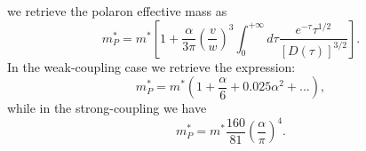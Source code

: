 we retrieve the polaron effective mass as 
\begin{equation}
    m^*_P=m^*\left[1+\frac{\alpha}{3\pi}\left(\frac{v}{w}\right)^3\int_0^{+\infty}d\tau \frac{e^{-\tau}\tau^{1/2}}{[D(\tau)]^{3/2}}\right].
\end{equation}
In the weak-coupling case we retrieve the expression:
\begin{equation}
    m^*_P=m^*(1+\frac{\alpha}{6}+0.025\alpha^2+...),
\end{equation}
while in the strong-coupling we have 
\begin{equation}
    m^*_P=m^*\frac{160}{81}\left(\frac{\alpha}{\pi}\right)^4.
\end{equation}
